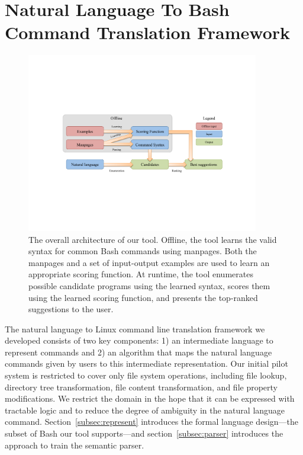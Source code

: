 \section{Natural Language To Bash Command Translation Framework}
\label{sec:framework}

\begin{figure}
    \begin{center} \includegraphics[width=4in]{architecture.pdf} \end{center}
    \caption{The overall architecture of our tool. Offline, the tool learns the
        valid syntax for common Bash commands using manpages. Both the manpages
        and a set of input-output examples are used to learn an appropriate
        scoring function. At runtime, the tool enumerates possible candidate
        programs using the learned syntax, scores them using the learned scoring
        function, and presents the top-ranked suggestions to the user.}
    \label{fig:arch}
\end{figure}

The natural language to Linux command line translation framework we developed consists of two key components:
1) an intermediate language to represent commands and
2) an algorithm that maps the natural language commands given by users to this intermediate representation. Our initial pilot system is restricted to cover only file system operations, including file lookup, directory tree transformation, file content transformation, and file property modifications. We restrict the domain in the hope that it can be expressed with tractable logic and to reduce the degree of ambiguity in the natural language command. Section~\ref{subsec:represent} introduces the formal language design---the subset of Bash our tool supports---and section~\ref{subsec:parser} introduces the approach to train the semantic parser.



